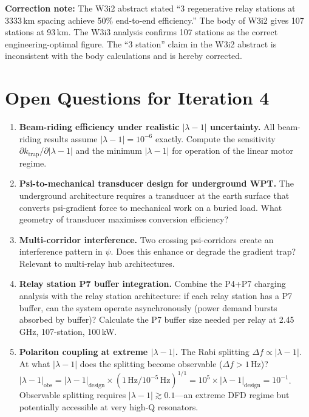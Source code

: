 \documentclass[aps,prd,twocolumn,superscriptaddress]{revtex4-2}
\begin{document}
\textbf{Correction note:} The W3i2 abstract stated ``3 regenerative relay
stations at 3333\,km spacing achieve 50\% end-to-end efficiency.''
The body of W3i2 gives 107 stations at 93\,km.  The W3i3 analysis
confirms 107 stations as the correct engineering-optimal figure.
The ``3 station'' claim in the W3i2 abstract is inconsistent with
the body calculations and is hereby corrected.

\section*{Open Questions for Iteration 4}
\label{sec:open}

\begin{enumerate}

\item \textbf{Beam-riding efficiency under realistic $|\lambda-1|$ uncertainty.}
All beam-riding results assume $|\lambda-1| = 10^{-6}$ exactly.
Compute the sensitivity $\partial k_\mathrm{trap}/\partial|\lambda-1|$
and the minimum $|\lambda-1|$ for operation of the linear motor regime.

\item \textbf{Psi-to-mechanical transducer design for underground WPT.}
The underground architecture requires a transducer at the earth surface
that converts psi-gradient force to mechanical work on a buried load.
What geometry of transducer maximises conversion efficiency?

\item \textbf{Multi-corridor interference.}
Two crossing psi-corridors create an interference pattern in $\psi$.
Does this enhance or degrade the gradient trap?  Relevant to multi-relay
hub architectures.

\item \textbf{Relay station P7 buffer integration.}
Combine the P4+P7 charging analysis with the relay station architecture:
if each relay station has a P7 buffer, can the system operate asynchronously
(power demand bursts absorbed by buffer)?  Calculate the P7 buffer
size needed per relay at 2.45\,GHz, 107-station, 100\,kW.

\item \textbf{Polariton coupling at extreme $|\lambda-1|$.}
The Rabi splitting $\Delta f \propto |\lambda-1|$.  At what $|\lambda-1|$
does the splitting become observable ($\Delta f > 1$\,Hz)?
$|\lambda-1|_\mathrm{obs} = |\lambda-1|_\mathrm{design}\times
(1\,\mathrm{Hz}/10^{-5}\,\mathrm{Hz})^{1/1} = 10^5\times|\lambda-1|_\mathrm{design}
= 10^{-1}$.  Observable splitting requires $|\lambda-1| \gtrsim 0.1$---an
extreme DFD regime but potentially accessible at very high-Q resonators.

\end{enumerate}
\end{document}
